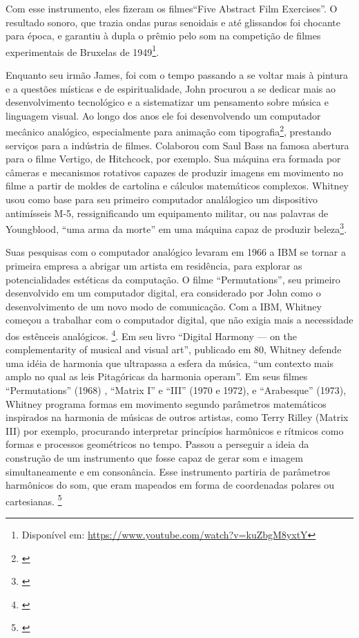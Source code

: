 Com esse instrumento, eles fizeram os filmes``Five Abstract Film Exercises''. O resultado sonoro, que trazia ondas puras senoidais e até glissandos foi chocante para época, e garantiu à dupla o prêmio pelo som na competição de filmes experimentais de Bruxelas de 1949\footnote{Disponível em: \url{https://www.youtube.com/watch?v=kuZbgM8yxtY}}.


Enquanto seu irmão James, foi com o tempo passando a se voltar mais à pintura e a questões místicas e de espiritualidade, John procurou a se dedicar mais ao desenvolvimento tecnológico e a sistematizar um pensamento sobre música e linguagem visual. Ao longo dos anos ele foi desenvolvendo um computador mecânico analógico, especialmente para animação com tipografia\footnote{\cite{Youngblood1970}}, prestando serviços para a indústria de filmes. Colaborou com Saul Bass na famosa abertura para o filme Vertigo, de Hitchcock, por exemplo. Sua máquina era formada por câmeras e mecanismos rotativos capazes de produzir imagens em movimento no filme a partir de moldes de cartolina e cálculos matemáticos complexos.  Whitney usou como base para seu primeiro computador analálogico um dispositivo antimísseis M-5, ressignificando um equipamento militar, ou nas palavras de Youngblood, ``uma arma da morte'' em uma máquina capaz de produzir beleza\footnote{\cite{Youngblood1970}}.

Suas pesquisas com o computador analógico levaram em 1966 a IBM se tornar a primeira empresa a abrigar um artista em residência, para explorar as potencialidades estéticas da computação. O filme ``Permutations'', seu primeiro desenvolvido em um computador digital, era considerado por John como o desenvolvimento de um novo modo de comunicação. Com a IBM, Whitney começou a trabalhar com o computador digital, que não exigia mais a necessidade dos estênceis analógicos. \footnote{\cite{Youngblood1970}}. 
Em seu livro ``Digital Harmony --- on the complementarity of musical and visual art'', publicado em 80, Whitney defende uma idéia de harmonia que ultrapassa a esfera da música, ``um contexto mais amplo no qual as leis Pitagóricas da harmonia operam''. Em seus filmes ``Permutations'' (1968) , ``Matrix I'' e ``III'' (1970 e 1972), e ``Arabesque'' (1973), Whitney programa formas em movimento segundo parâmetros matemáticos inspirados na harmonia de músicas de outros artistas, como Terry Rilley (Matrix III) por exemplo, procurando interpretar princípios harmônicos e rítmicos como formas e processos geométricos no tempo. Passou a perseguir a ideia da construção de um instrumento que fosse capaz de gerar som e imagem simultaneamente e em consonância. Esse instrumento partiria de parâmetros harmônicos do som, que eram mapeados em forma de coordenadas polares ou cartesianas. \footnote{\cite{Whitney1980}}

